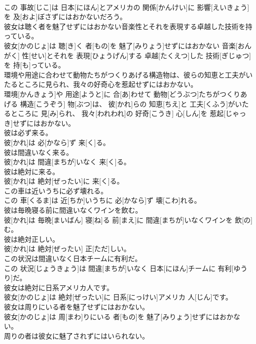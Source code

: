\documentclass[8pt]{extreport}
\begin{document}
\begin{CJK}{UTF8}{min}
\\	この 事故[じこ]は 日本[にほん]とアメリカの 関係[かんけい]に 影響[えいきょう]を 及[およ]ぼさずにはおかないだろう。
\\	彼女は聴く者を魅了せずにはおかない音楽性とそれを表現する卓越した技術を持っている。	
\\	彼女[かのじょ]は 聴[き]く 者[もの]を 魅了[みりょう]せずにはおかない 音楽[おんがく] 性[せい]とそれを 表現[ひょうげん]する 卓越[たくえつ]した 技術[ぎじゅつ]を 持[も]っている。
\\	環境や用途に合わせて動物たちがつくりあげる構造物は、彼らの知恵と工夫がいたるところに見られ、我々の好奇心を惹起せずにはおかない。	
\\	環境[かんきょう]や 用途[ようと]に 合[あ]わせて 動物[どうぶつ]たちがつくりあげる 構造[こうぞう] 物[ぶつ]は、 彼[かれ]らの 知恵[ちえ]と 工夫[くふう]がいたるところに 見[み]られ、 我々[われわれ]の 好奇[こうき] 心[しん]を 惹起[じゃっき]せずにはおかない。
\\	彼は必ず来る。	
\\	彼[かれ]は 必[かなら]ず 来[く]る。
\\	彼は間違いなく来る。	
\\	彼[かれ]は 間違[まちが]いなく 来[く]る。
\\	彼は絶対に来る。	
\\	彼[かれ]は 絶対[ぜったい]に 来[く]る。
\\	この車は近いうちに必ず壊れる。	
\\	この 車[くるま]は 近[ちか]いうちに 必[かなら]ず 壊[こわ]れる。
\\	彼は毎晩寝る前に間違いなくワインを飲む。	
\\	彼[かれ]は 毎晩[まいばん] 寝[ね]る 前[まえ]に 間違[まちが]いなくワインを 飲[の]む。
\\	彼は絶対正しい。	
\\	彼[かれ]は 絶対[ぜったい] 正[ただ]しい。
\\	この状況は間違いなく日本チームに有利だ。	
\\	この 状況[じょうきょう]は 間違[まちが]いなく 日本[にほん]チームに 有利[ゆうり]だ。
\\	彼女は絶対に日系アメリカ人です。	
\\	彼女[かのじょ]は 絶対[ぜったい]に 日系[にっけい]アメリカ 人[じん]です。
\\	彼女は周りにいる者を魅了せずにはおかない。	
\\	彼女[かのじょ]は 周[まわ]りにいる 者[もの]を 魅了[みりょう]せずにはおかない。
\\	周りの者は彼女に魅了されずにはいられない。	

\end{CJK}
\end{document}
